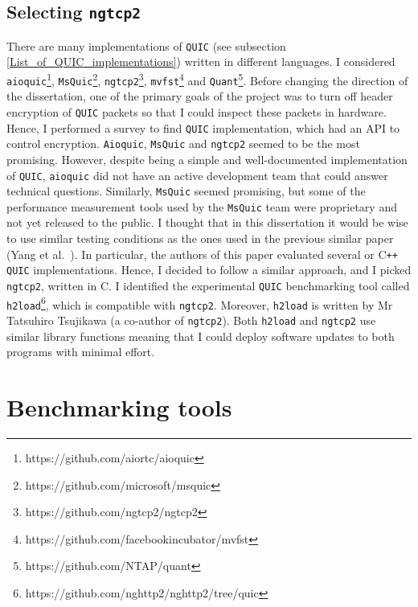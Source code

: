 \documentclass[12pt,a4paper,twoside,openright]{report}
\begin{document}
\subsection{Selecting  \texttt{ngtcp2}}
There are many implementations of \texttt{QUIC} (see subsection \ref{List_of_QUIC_implementations}) written in different languages.
I considered  \texttt{aioquic}\footnote{https://github.com/aiortc/aioquic},  \texttt{MsQuic}\footnote{https://github.com/microsoft/msquic},  \texttt{ngtcp2}\footnote{https://github.com/ngtcp2/ngtcp2},  \texttt{mvfst}\footnote{https://github.com/facebookincubator/mvfst} and \texttt{Quant}\footnote{https://github.com/NTAP/quant}.
Before changing the direction of the dissertation, one of the primary goals of the project was to turn off header encryption of \texttt{QUIC} packets so that I could inspect these packets in hardware.
Hence, I performed a survey to find \texttt{QUIC} implementation, which had an API to control encryption. 
\texttt{Aioquic}, \texttt{MsQuic} and \texttt{ngtcp2} seemed to be the most promising.
However, despite being a simple and well-documented implementation of \texttt{QUIC}, \texttt{aioquic} did not have an active development team that could answer technical questions.
Similarly, \texttt{MsQuic} seemed promising, but some of the performance measurement tools used by the \texttt{MsQuic} team were proprietary and not yet released to the public. 
I thought that in this dissertation it would be wise to use similar testing conditions as the ones used in the previous similar paper (Yang et al.~\cite{Making_QUIC_Quicker}).
In particular, the authors of this paper evaluated several  or C\texttt{++} \texttt{QUIC} implementations.
Hence, I decided to follow a similar approach, and I picked \texttt{ngtcp2}, written in C.
I identified the experimental \texttt{QUIC} benchmarking tool called \texttt{h2load}\footnote{https://github.com/nghttp2/nghttp2/tree/quic}, which is compatible with \texttt{ngtcp2}.
Moreover, \texttt{h2load} is written by Mr Tatsuhiro  Tsujikawa (a co-author of \texttt{ngtcp2}).
Both \texttt{h2load} and \texttt{ngtcp2} use similar library functions meaning that I could deploy software updates to both programs with minimal effort.





\section{Benchmarking tools}
\end{document}
